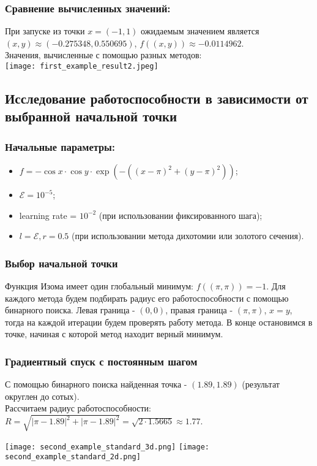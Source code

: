 \documentclass{article}
\begin{document}
\qquad

\subsubsection*{Сравнение вычисленных значений:} 

\noindent При запуске из точки $x = (-1, 1)$ ожидаемым значением является $(x, y) \approx (-0.275348, 0.550695)$, $f((x, y)) \approx -0.0114962$. \\

\noindent Значения, вычисленные с помощью разных методов: \\

\noindent \texttt{[image: first\_example\_result2.jpeg]}
\subsection*{Исследование работоспособности в зависимости от выбранной начальной точки}
\subsubsection*{Начальные параметры:}
\begin{itemize}
    \item $f = -\cos{x} \cdot \cos{y} \cdot \exp{(-((x - \pi)^2 + (y - \pi)^2))}$;
    \item $\mathcal{E} = 10^{-5}$;
    \item learning rate = $10^{-2}$ (при использовании фиксированного шага);
    \item $l = \mathcal{E}, r = 0.5$ (при использовании метода дихотомии или золотого сечения).
\end{itemize}
\subsubsection*{Выбор начальной точки}
Функция Изома имеет один глобальный минимум: $f((\pi, \pi)) = -1$. Для каждого метода будем подбирать радиус его работоспособности с помощью бинарного поиска. Левая граница - $(0, 0)$, правая граница - $(\pi, \pi)$, $x = y$, тогда на каждой итерации будем проверять работу метода. В конце остановимся в точке, начиная с которой метод находит верный минимум.
\subsubsection*{Градиентный спуск с постоянным шагом}
С помощью бинарного поиска найденная точка - $(1.89, 1.89)$ (результат округлен до сотых). \\ Рассчитаем радиус работоспособности: $R = \sqrt{|\pi - 1.89|^2 + |\pi - 1.89|^2} = \sqrt{2 \cdot 1.5665} \approx 1.77$.
\begin{center}
    \texttt{[image: second\_example\_standard\_3d.png]}
    \texttt{[image: second\_example\_standard\_2d.png]}
    \label{fig:enter-label}
\end{center}
\end{document}
